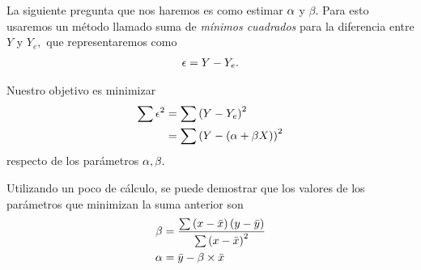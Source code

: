 La siguiente pregunta que nos haremos es como estimar $\alpha$ y $\beta.$  Para esto usaremos un método llamado suma de  \emph{mínimos cuadrados} para la diferencia entre $Y$ y $Y_{e},$ que representaremos como
\begin{align}
	\epsilon = Y-Y_{e}.
\end{align}



Nuestro objetivo es minimizar
\begin{align}
	\sum \epsilon^{2} & = \sum \left( Y-Y_{e} \right)^{2}\\
	&= \sum \left( Y - \left( \alpha+\beta X \right) \right)^{2}
\end{align}
respecto de los parámetros $\alpha, \beta.$


Utilizando un poco de cálculo, se puede demostrar que los valores de los parámetros que minimizan la suma anterior son
\begin{align}
	\label{beta}
	\beta &= \dfrac{\sum \left( x-\bar{x} \right)\left( y-\bar{y} \right)}{\sum\left( x-\bar{x} \right)^{2}}\\
	\label{alfa}
	\alpha &= \bar{y}-\beta\times \bar{x}
\end{align}

% 
% 